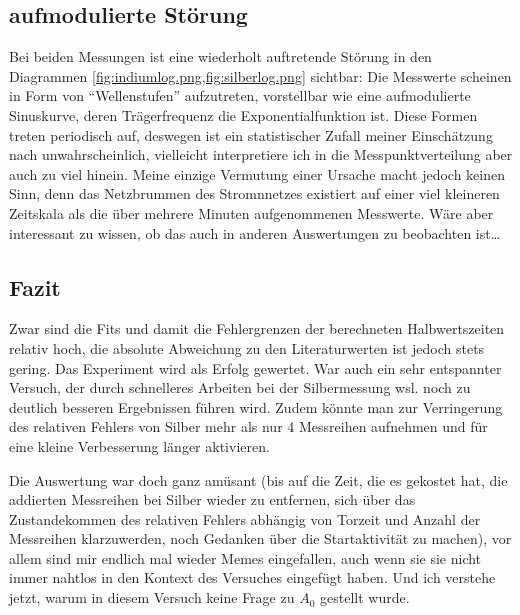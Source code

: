 \subsection{aufmodulierte Störung} 
Bei beiden Messungen ist eine wiederholt auftretende Störung in den Diagrammen \cref{fig:indiumlog.png,fig:silberlog.png} sichtbar: Die Messwerte scheinen in Form von \enquote{Wellenstufen} aufzutreten, vorstellbar wie eine aufmodulierte Sinuskurve, deren Trägerfrequenz die Exponentialfunktion ist. Diese Formen treten periodisch auf, deswegen ist ein statistischer Zufall meiner Einschätzung nach unwahrscheinlich, vielleicht interpretiere ich in die Messpunktverteilung aber auch zu viel hinein. Meine einzige Vermutung einer Ursache macht jedoch keinen Sinn, denn das Netzbrummen des Stromnnetzes existiert auf einer viel kleineren Zeitskala als die über mehrere Minuten aufgenommenen Messwerte. Wäre aber interessant zu wissen, ob das auch in anderen Auswertungen zu beobachten ist\dots

\subsection{Fazit}
Zwar sind die Fits und damit die Fehlergrenzen der berechneten Halbwertszeiten relativ hoch, die absolute Abweichung zu den Literaturwerten ist jedoch stets gering. Das Experiment wird als Erfolg gewertet. War auch ein sehr entspannter Versuch, der durch schnelleres Arbeiten bei der Silbermessung wsl. noch zu deutlich besseren Ergebnissen führen wird. Zudem könnte man zur Verringerung des relativen Fehlers von Silber mehr als nur 4 Messreihen aufnehmen und für eine kleine Verbesserung länger aktivieren. 

Die Auswertung war doch ganz amüsant (bis auf die Zeit, die es gekostet hat, die addierten Messreihen bei Silber wieder zu entfernen, sich über das Zustandekommen des relativen Fehlers abhängig von Torzeit und Anzahl der Messreihen klarzuwerden, noch Gedanken über die Startaktivität zu machen), vor allem sind mir endlich mal wieder Memes eingefallen, auch wenn sie sie nicht immer nahtlos in den Kontext des Versuches eingefügt haben. Und ich verstehe jetzt, warum in diesem Versuch keine Frage zu \(A_0\) gestellt wurde.

